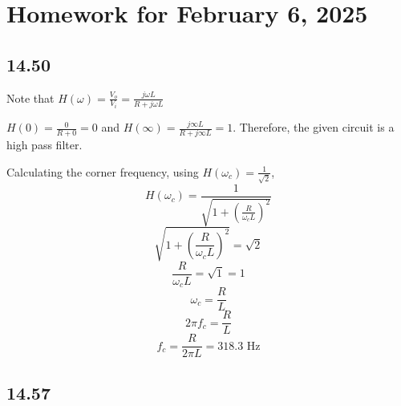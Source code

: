 \documentclass{article}
\begin{document}
\section*{Homework for February 6, 2025}

\subsection*{14.50}

Note that $H(\omega)=\frac{V_o}{V_i}=\frac{j\omega L}{R + j\omega L}$

$H(0)=\frac{0}{R + 0}=0$ and $H(\infty)=\frac{j\infty L}{R + j\infty L}=1$. Therefore, the given circuit is a high pass filter.

Calculating the corner frequency, using $H(\omega_c)=\frac{1}{\sqrt{2}}$,
$$H(\omega_c)=\frac{1}{\sqrt{1+\left(\frac{R}{\omega_cL}\right)^2}}$$
$$\sqrt{1+\left(\frac{R}{\omega_c L}\right)^2} = \sqrt{2}$$
$$\frac{R}{\omega_cL} = \sqrt{1}=1$$
$$\omega_c=\frac{R}{L}$$
$$2\pi f_c=\frac{R}{L}$$
$$f_c=\frac{R}{2\pi L}=318.3 \text{ Hz} $$

\subsection*{14.57}
\end{document}
